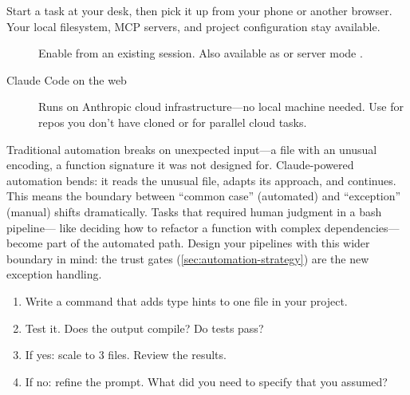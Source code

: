 Start a task at your desk, then pick it up from your phone or another browser.
Your local filesystem, MCP servers, and project configuration stay available.

\begin{description}
  \item[] Enable from an existing session. Also
    available as  or server mode
    .
  \item[Claude Code on the web] Runs on Anthropic cloud infrastructure---no
    local machine needed. Use for repos you don't have cloned or for
    parallel cloud tasks.
\end{description}


\begin{keyinsight}
Traditional automation breaks on unexpected input---a file with an
unusual encoding, a function signature it was not designed for.
Claude-powered automation bends: it reads the unusual file, adapts
its approach, and continues. This means the boundary between
``common case'' (automated) and ``exception'' (manual) shifts
dramatically. Tasks that required human judgment in a bash pipeline---
like deciding how to refactor a function with complex dependencies---
become part of the automated path. Design your pipelines with this
wider boundary in mind: the trust gates (\cref{sec:automation-strategy})
are the new exception handling.
\end{keyinsight}

\begin{trybox}
\begin{enumerate}
  \item Write a  command that adds type hints to one file in your project.
  \item Test it. Does the output compile? Do tests pass?
  \item If yes: scale to 3 files. Review the results.
  \item If no: refine the prompt. What did you need to specify that you assumed?
\end{enumerate}
\end{trybox}
